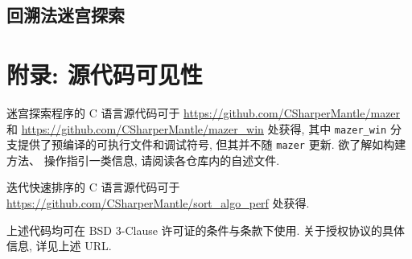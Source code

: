 \documentclass[a4paper]{article}
\begin{document}
\subsection{回溯法迷宫探索}



\section{附录: 源代码可见性}
\label{appendix_source_code}

迷宫探索程序的 C 语言源代码可于 \url{https://github.com/CSharperMantle/mazer} 和 \url{https://github.com/CSharperMantle/mazer_win} 处获得, 其中 \texttt{mazer\_win} 分支提供了预编译的可执行文件和调试符号, 但其并不随 \texttt{mazer} 更新. 欲了解如构建方法、 操作指引一类信息, 请阅读各仓库内的自述文件.

迭代快速排序的 C 语言源代码可于 \url{https://github.com/CSharperMantle/sort_algo_perf} 处获得.

上述代码均可在 BSD 3-Clause 许可证的条件与条款下使用. 关于授权协议的具体信息, 详见上述 URL.
\end{document}
